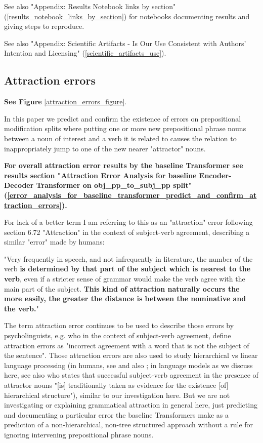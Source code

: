 \documentclass[11pt]{article}
\begin{document}
See also "Appendix: Results Notebook links by section" (\ref{results_notebook_links_by_section}) for notebooks documenting results and giving steps to reproduce.

See also "Appendix: Scientific Artifacts - Is Our Use Consistent with Authors' Intention and Licensing" (\ref{scientific_artifacts_use}).

\subsection{Attraction errors}
\label{attraction_errors}

\textbf{See Figure} \ref{attraction_errors_figure}.

In this paper we predict and confirm the existence of errors on prepositional modification splits where putting one or more new prepositional phrase nouns between a noun of interest and a verb it is related to causes the relation to inappropriately jump to one of the new nearer "attractor" nouns. 

\textbf{For overall attraction error results by the baseline Transformer see results section "Attraction Error Analysis for \citep{Wu2023} baseline Encoder-Decoder Transformer on obj\_pp\_to\_subj\_pp split" (\ref{error_analysis_for_baseline_transformer_predict_and_confirm_attraction_errors}).}

For lack of a better term I am referring to this as an "attraction" error following \citep{jespersen1913modernenglishgrammar1954reprint} section 6.72 "Attraction" in the context of subject-verb agreement, describing a similar "error" made by humans:

"Very frequently in speech, and not infrequently in
literature, the number of the verb \textbf{is determined by
that part of the subject which is nearest to the verb},
even if a stricter sense of grammar would make
the verb agree with the main part of the subject.
\textbf{This kind of attraction naturally occurs the more easily, the greater the distance is between the nominative and the verb.}"

The term attraction error continues to be used to describe those errors by psycholinguists, e.g. \citep{FRANCK2006173} who in the context of subject-verb agreement, define attraction errors as "incorrect agreement with a word that is not the subject of the sentence".
Those attraction errors are also used to study hierarchical vs linear language processing (in humans, see \citep{FRANCK2006173} and also \citep{VIGLIOCCO1998B13}; in language models as we discuss here, see also \citep{goldberg2019assessingbertssyntacticabilities} who states that successful subject-verb agreement in the presence of attractor nouns  "[is] traditionally taken as evidence for the existence [of] hierarchical structure"), similar to our investigation here. But we are not investigating or explaining grammatical attraction in general here, just predicting and documenting a particular error the baseline Transformers make as a prediction of a non-hierarchical, non-tree structured approach without a rule for ignoring intervening prepositional phrase nouns.
\end{document}
